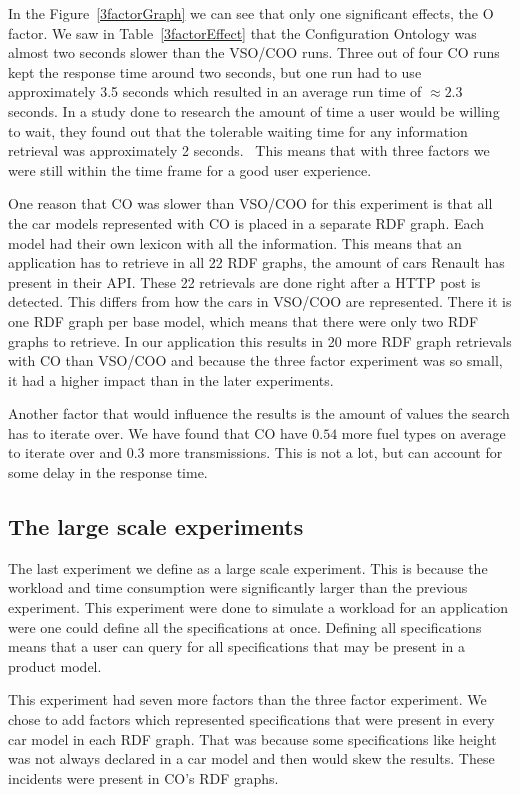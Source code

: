 \documentclass{llncs}
\begin{document}
In the Figure~\ref{3factorGraph} we can see that only one significant
effects, the O factor. We saw in Table~\ref{3factorEffect} that the
Configuration Ontology was almost two seconds slower than the VSO/COO
runs.  Three out of four CO runs kept the response time around two
seconds, but one run had to use approximately 3.5 seconds which
resulted in an average run time of $\approx2.3$ seconds.  In a study
done to research the amount of time a user would be willing to wait,
they found out that the tolerable waiting time for any information
retrieval was approximately 2 seconds.~\cite{waitTime} This means that
with three factors we were still within the time frame for a good user
experience.

One reason that CO was slower than VSO/COO for this experiment is that
all the car models represented with CO is placed in a separate RDF
graph. Each model had their own lexicon with all the information.
This means that an application has to retrieve in all 22 RDF graphs,
the amount of cars Renault has present in their API. These 22
retrievals are done right after a HTTP post is detected. This differs
from how the cars in VSO/COO are represented. There it is one RDF
graph per base model, which means that there were only two RDF graphs
to retrieve.  In our application this results in 20 more RDF graph
retrievals with CO than VSO/COO and because the three factor
experiment was so small, it had a higher impact than in the later
experiments.

Another factor that would influence the results is the amount of
values the search has to iterate over.  We have found that CO have
$0.54$ more fuel types on average to iterate over and $0.3$ more
transmissions. This is not a lot, but can account for some delay in
the response time.

\subsection{The large scale experiments}
The last experiment we define as a large scale experiment. This is
because the workload and time consumption were significantly larger
than the previous experiment. This experiment were done
to simulate a workload for an application were one could define all
the specifications at once. Defining all specifications means that a
user can query for all specifications that may be present in a product
model.

This experiment had seven more factors than the three factor experiment.  We chose to add
factors which represented specifications that were present in every
car model in each RDF graph. That was because some specifications like
height was not always declared in a car model and then would skew the
results. These incidents were present in CO's RDF graphs.
\end{document}
